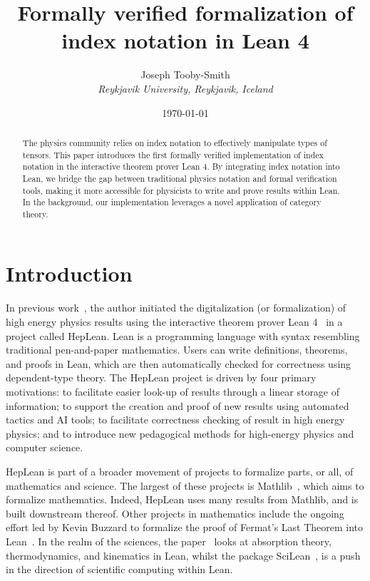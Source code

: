 \documentclass[a4paper, 11pt]{article}
\title{Formally verified formalization of index notation in Lean 4}
\author{Joseph Tooby-Smith \\ \textit{Reykjavik University, Reykjavik, Iceland}}
\date{\today}
\begin{document}
\maketitle
\vspace{-1cm}
\begin{abstract}
The physics community relies on index notation to effectively manipulate types of tensors.
This paper introduces the first formally verified implementation of index notation in the
interactive theorem prover Lean 4. By integrating index notation into Lean, we bridge the gap between 
traditional physics notation and formal verification tools, 
making it more accessible for physicists to write and prove results within Lean.
In the background, our implementation leverages a novel application of category theory.
\end{abstract}

\section{Introduction}

In previous work~\cite{HepLean}, the author initiated the digitalization (or formalization) 
of high energy physics 
results using the interactive theorem prover Lean 4~\cite{lean} in a project called HepLean. 
Lean is a
programming language with syntax resembling traditional pen-and-paper mathematics. 
Users can write definitions, theorems, and proofs in Lean,
which are then automatically checked for correctness using dependent-type theory.
The HepLean project is driven by four primary motivations: to facilitate easier look-up of results
 through a linear storage of information; to support the creation and proof of new results using 
 automated tactics and AI tools; to facilitate correctness checking of result in high energy physics; 
 and to introduce new pedagogical methods for high-energy physics and computer science.

HepLean is part of a broader movement of projects
to formalize parts, or all, of 
mathematics and science. The largest of these projects is Mathlib~\cite{mathlib}, which aims to formalize
mathematics. Indeed, HepLean uses many results from Mathlib, and is built downstream thereof.
Other projects in mathematics include the ongoing effort led by Kevin Buzzard to formalize the proof of Fermat's
Last Theorem into Lean~\cite{FLT}. 
In the realm of the sciences, the paper~\cite{josephson} looks at absorption theory, thermodynamics, and kinematics in Lean, 
whilst the package SciLean~\cite{SciLean}, is a push in the direction of scientific computing within Lean. 
\end{document}
